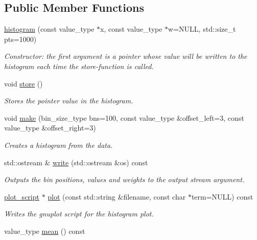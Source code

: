 \subsection*{Public Member Functions}
\begin{DoxyCompactItemize}
\item 
\hyperlink{a00280_ac752e3b23a0235893a23adc3435a8b3b}{histogram} (const value\-\_\-type $\ast$x, const value\-\_\-type $\ast$w=N\-U\-L\-L, std\-::size\-\_\-t pts=1000)
\begin{DoxyCompactList}\small\item\em Constructor\-: the first argument is a pointer whose value will be written to the histogram each time the store-\/function is called. \end{DoxyCompactList}\item 
\hypertarget{a00280_a9b41b5476ebb8bccfabe1ab2b6bb149a}{void \hyperlink{a00280_a9b41b5476ebb8bccfabe1ab2b6bb149a}{store} ()}\label{a00280_a9b41b5476ebb8bccfabe1ab2b6bb149a}

\begin{DoxyCompactList}\small\item\em Stores the pointer value in the histogram. \end{DoxyCompactList}\item 
void \hyperlink{a00280_aafa937e09f5a4886b19825d1c62a6cd9}{make} (bin\-\_\-size\-\_\-type bns=100, const value\-\_\-type \&offset\-\_\-left=3, const value\-\_\-type \&offset\-\_\-right=3)
\begin{DoxyCompactList}\small\item\em Creates a histogram from the data. \end{DoxyCompactList}\item 
std\-::ostream \& \hyperlink{a00280_a373451c0042976a4aa1de0620f249e14}{write} (std\-::ostream \&os) const 
\begin{DoxyCompactList}\small\item\em Outputs the bin positions, values and weights to the output stream argument. \end{DoxyCompactList}\item 
\hypertarget{a00280_a3eabc8668b570eb6126c8e16555f298b}{\hyperlink{a00426}{plot\-\_\-script} $\ast$ \hyperlink{a00280_a3eabc8668b570eb6126c8e16555f298b}{plot} (const std\-::string \&filename, const char $\ast$term=N\-U\-L\-L) const }\label{a00280_a3eabc8668b570eb6126c8e16555f298b}

\begin{DoxyCompactList}\small\item\em Writes the gnuplot script for the histogram plot. \end{DoxyCompactList}\item 
\hypertarget{a00280_a22a3305314453b74248c1ba4050afe0c}{value\-\_\-type \hyperlink{a00280_a22a3305314453b74248c1ba4050afe0c}{mean} () const }\label{a00280_a22a3305314453b74248c1ba4050afe0c}


\end{DoxyCompactItemize}
